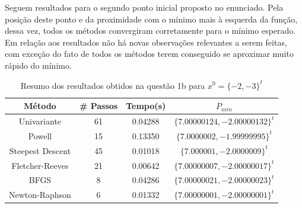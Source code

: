 \documentclass[10pt, a4paper]{article}
\begin{document}
Seguem resultados para o segundo ponto inicial proposto no enunciado. Pela posição deste ponto e da proximidade com 
o mínimo mais à esquerda da função, dessa vez, todos os métodos convergiram corretamente para o mínimo esperado.
Em relação aos resultados não há novas observações relevantes a serem feitas, com exceção do fato de todos os métodos
terem conseguido se aproximar muito rápido do mínimo.

\begin{table}[H]
  \begin{center}
    \begin{tabular}{c|c|c|c}
      \textbf{Método} & \textbf{\# Passos} & \textbf{Tempo(s)} & \textbf{$P_{min}$}\\
      \hline
      Univariante       & 61  & 0.04288 & $\{7.00000124, -2.00000132\}^t$\\
      Powell            & 15  & 0.13350 & $\{7.0000002, -1.99999995\}^t$\\
      Steepest Descent  & 45  & 0.01018 & $\{7.000001, -2.0000009\}^t$\\
      Fletcher-Reeves   & 21  & 0.00642 & $\{7.00000007, -2.00000017\}^t$\\
      BFGS              & 8   & 0.04286 & $\{7.00000021, -2.00000023\}^t$\\
      Newton-Raphson    & 6   & 0.01332 & $\{7.00000001, -2.00000001\}^t$\\
    \end{tabular}
  \end{center}
  \caption{Resumo dos resultados obtidos na questão 1b para $x^0 = \{-2,-3\}^t$}
\end{table}



\end{document}

